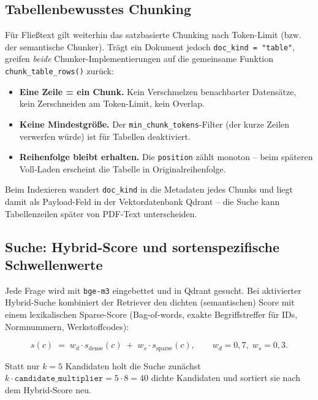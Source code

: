\documentclass[12pt, a4paper]{article}
\begin{document}
\subsection{Tabellenbewusstes Chunking}
\label{sec:chunking}

Für Fließtext gilt weiterhin das satzbasierte Chunking nach Token-Limit
(bzw. der semantische Chunker). Trägt ein Dokument jedoch
\texttt{doc\_kind = "table"}, greifen \emph{beide} Chunker-Implementierungen
auf die gemeinsame Funktion \texttt{chunk\_table\_rows()} zurück:

\begin{itemize}[itemsep=2pt]
  \item \textbf{Eine Zeile = ein Chunk.} Kein Verschmelzen benachbarter
        Datensätze, kein Zerschneiden am Token-Limit, kein Overlap.
  \item \textbf{Keine Mindestgröße.} Der \texttt{min\_chunk\_tokens}-Filter
        (der kurze Zeilen verwerfen würde) ist für Tabellen deaktiviert.
  \item \textbf{Reihenfolge bleibt erhalten.} Die \texttt{position} zählt
        monoton -- beim späteren Voll-Laden erscheint die Tabelle in
        Originalreihenfolge.
\end{itemize}

Beim Indexieren wandert \texttt{doc\_kind} in die Metadaten jedes Chunks und
liegt damit als Payload-Feld in der Vektordatenbank Qdrant -- die Suche kann
Tabellenzeilen später von PDF-Text unterscheiden.

\subsection{Suche: Hybrid-Score und sortenspezifische Schwellenwerte}
\label{sec:retrieval}

Jede Frage wird mit \texttt{bge-m3} eingebettet und in Qdrant gesucht. Bei
aktivierter Hybrid-Suche kombiniert der Retriever den dichten (semantischen)
Score mit einem lexikalischen Sparse-Score (Bag-of-words, exakte
Begriffstreffer für IDs, Normnummern, Werkstoffcodes):

\begin{equation*}
  s(c) \;=\; w_d \cdot s_{\text{dense}}(c) \;+\; w_s \cdot s_{\text{sparse}}(c),
  \qquad w_d = 0{,}7,\; w_s = 0{,}3 .
\end{equation*}

Statt nur $k=5$ Kandidaten holt die Suche zunächst
$k \cdot \texttt{candidate\_multiplier} = 5 \cdot 8 = 40$ dichte Kandidaten und
sortiert sie nach dem Hybrid-Score neu.
\end{document}
